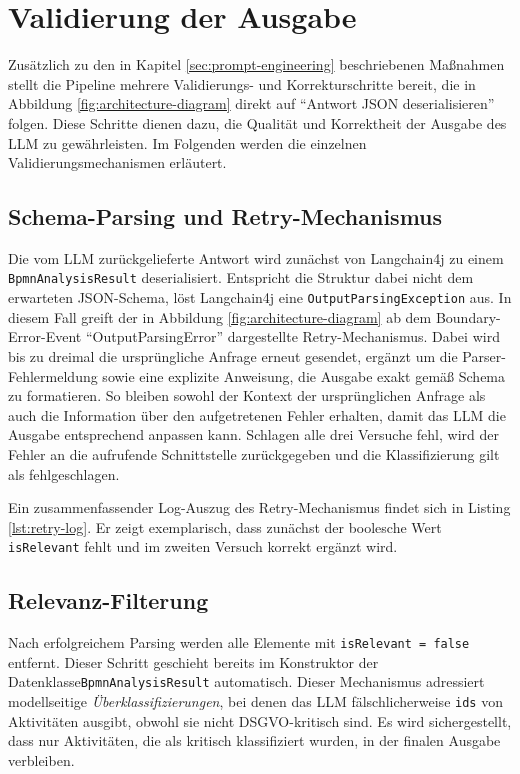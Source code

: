 \section{Validierung der Ausgabe}\label{sec:validierung-der-ausgabe}

Zusätzlich zu den in Kapitel \ref{sec:prompt-engineering} beschriebenen Maßnahmen stellt die Pipeline mehrere Validierungs- und Korrekturschritte bereit, die in Abbildung \ref{fig:architecture-diagram} direkt auf \enquote{Antwort JSON deserialisieren} folgen. Diese Schritte dienen dazu, die Qualität und Korrektheit der Ausgabe des \ac{LLM} zu gewährleisten. Im Folgenden werden die einzelnen Validierungsmechanismen erläutert.

\subsection*{Schema-Parsing und Retry-Mechanismus}

Die vom \ac{LLM} zurückgelieferte Antwort wird zunächst von Langchain4j zu einem \texttt{BpmnAnalysisResult} deserialisiert. Entspricht die Struktur dabei nicht dem erwarteten JSON-Schema, löst Langchain4j eine \texttt{OutputParsingException} aus. In diesem Fall greift der in Abbildung \ref{fig:architecture-diagram} ab dem Boundary-Error-Event \enquote{OutputParsingError} dargestellte Retry-Mechanismus. Dabei wird bis zu dreimal die ursprüngliche Anfrage erneut gesendet, ergänzt um die Parser-Fehlermeldung sowie eine explizite Anweisung, die Ausgabe exakt gemäß Schema zu formatieren. So bleiben sowohl der Kontext der ursprünglichen Anfrage als auch die Information über den aufgetretenen Fehler erhalten, damit das \ac{LLM} die Ausgabe entsprechend anpassen kann. Schlagen alle drei Versuche fehl, wird der Fehler an die aufrufende Schnittstelle zurückgegeben und die Klassifizierung gilt als fehlgeschlagen.

Ein zusammenfassender Log-Auszug des Retry-Mechanismus findet sich in Listing \ref{lst:retry-log}. Er zeigt exemplarisch, dass zunächst der boolesche Wert \texttt{isRelevant} fehlt und im zweiten Versuch korrekt ergänzt wird.

\subsection*{Relevanz-Filterung}

Nach erfolgreichem Parsing werden alle Elemente mit \texttt{isRelevant = false} entfernt. Dieser Schritt geschieht bereits im Konstruktor der Datenklasse\break\texttt{BpmnAnalysisResult} automatisch. Dieser Mechanismus adressiert modellseitige \emph{Überklassifizierungen}, bei denen das \ac{LLM} fälschlicherweise \texttt{ids} von Aktivitäten ausgibt, obwohl sie nicht \ac{DSGVO}-kritisch sind. Es wird sichergestellt, dass nur Aktivitäten, die als kritisch klassifiziert wurden, in der finalen Ausgabe verbleiben.

